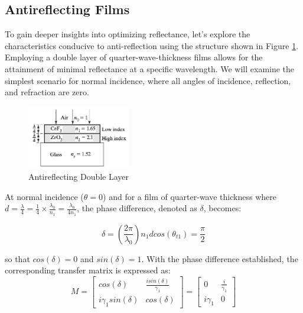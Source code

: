 \subsection{Antireflecting Films}
To gain deeper insights into optimizing reflectance, let's explore the characteristics conducive to anti-reflection using the structure shown in Figure \ref{Sample Antireflecting Double Layer}. Employing a double layer of quarter-wave-thickness films allows for the attainment of minimal reflectance at a specific wavelength. We will examine the simplest scenario for normal incidence, where all angles of incidence, reflection, and refraction are zero.

\begin{figure}[ht!]
  \centering
  \includegraphics[width=0.4\textwidth]{Chapters/Figures/Chapter 2 Figures/Antireflecting Double Layer.jpeg}
  \caption{Antireflecting Double Layer}
  \label{Sample Antireflecting Double Layer}
\end{figure}

At normal incidence ($\theta=0$) and for a film of quarter-wave thickness where $d=\frac{\lambda}{4} = \frac{1}{4} \times \frac{\lambda_0}{n_1} = \frac{\lambda_0}{4n_1}$, the phase difference, denoted as $\delta$, becomes: 

\begin{equation}
    \delta = \left(\frac{2\pi}{\lambda_0}\right) n_1dcos(\theta_{t1}) = \frac{\pi}{2}
\end{equation}

so that $cos(\delta) = 0$ and $sin(\delta) = 1$. With the phase difference established, the corresponding transfer matrix is expressed as:
    \[
    M = 
            \begin{bmatrix}
            cos(\delta) & \frac{isin(\delta)}{\gamma_1} \\
            i\gamma_1sin(\delta) & cos(\delta)
            \end{bmatrix} = 
                \begin{bmatrix}
                0 & \frac{i}{\gamma_1}  \\
                i\gamma_1 & 0
              \end{bmatrix}
    \]

